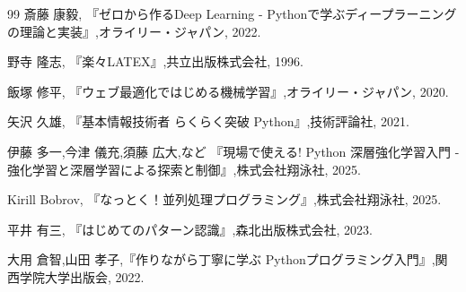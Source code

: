 \documentclass{jarticle}
\begin{document}
\begin{thebibliography}{99}
 斎藤 康毅, 『ゼロから作るDeep Learning - Pythonで学ぶディープラーニングの理論と実装』,オライリー・ジャパン, 2022.

 野寺 隆志, 『楽々LATEX』,共立出版株式会社, 1996.

 飯塚 修平, 『ウェブ最適化ではじめる機械学習』,オライリー・ジャパン, 2020.

 矢沢 久雄, 『基本情報技術者 らくらく突破 Python』,技術評論社, 2021.

 伊藤 多一,今津 儀充,須藤 広大,など 『現場で使える! Python 深層強化学習入門 - 強化学習と深層学習による探索と制御』,株式会社翔泳社, 2025.

 Kirill Bobrov, 『なっとく！並列処理プログラミング』,株式会社翔泳社, 2025.

 平井 有三, 『はじめてのパターン認識』,森北出版株式会社, 2023.

 大用 倉智,山田 孝子,『作りながら丁寧に学ぶ Pythonプログラミング入門』,関西学院大学出版会, 2022.

\end{thebibliography}
\end{document}
